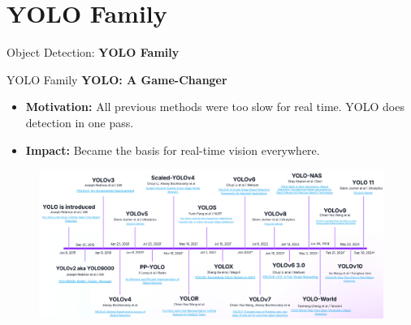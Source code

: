 \section{YOLO Family}
\begin{frame}{}
    \LARGE Object Detection: \textbf{YOLO Family}
\end{frame}

\begin{frame}[allowframebreaks]{YOLO Family}
    \textbf{YOLO: A Game-Changer}

    \begin{itemize}
        \item \textbf{Motivation:} All previous methods were too slow for real time. YOLO does detection in one pass.
        \item \textbf{Impact:} Became the basis for real-time vision everywhere.
    \end{itemize}
    \begin{figure}
        \centering
        \includegraphics[width=1.08\textwidth,height=1.0\textheight,keepaspectratio]{images/object-detect/yolo-family.png}
    \end{figure}
\end{frame}






% 
% 




